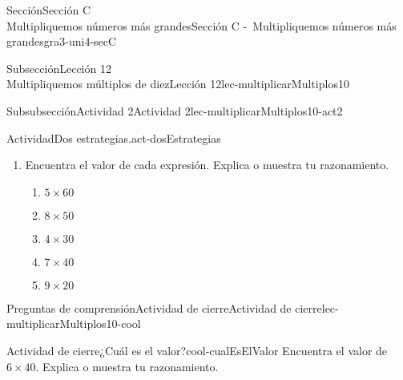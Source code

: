 \begin{sectionptx}{Sección}{{\Large Sección C\\}Multipliquemos números más grandes}{}{Sección C -~Multipliquemos números más grandes}{}{}{gra3-uni4-secC}
\begin{subsectionptx}{Subsección}{{\normalsize Lección 12\\[-0.05cm]}Multipliquemos múltiplos de diez}{}{Lección 12}{}{}{lec-multiplicarMultiplos10}
\begin{subsubsectionptx}{Subsubsección}{Actividad 2}{}{Actividad 2}{}{}{lec-multiplicarMultiplos10-act2}
\begin{activity}{Actividad}{Dos estrategias.}{act-dosEstrategias}
\begin{enumerate}
\begin{multicols}{2}
Dos estudiantes usaron bloques en base diez para encontrar el valor de \(8\times 30\).%
\begin{image}{0}{1}{0}{}%
\texttt{[image: external/svg-source/tikz-file-149356-scale13.pdf]}
\end{image}%
\end{multicols}
\begin{itemize}[label=\textbullet]
\item{}Jada contó: 30, 60, 90, 120, 150, 180, 210, 240 y dijo que la respuesta es 240.%
\item{}Kiran dijo que él sabía que \(8\times 3\) es 24, luego encontró \(24\times 10\) y obtuvo 240.%
\end{itemize}
¿En qué se parecen las estrategias de Jada y de Kiran? ¿En qué son diferentes?%
\item{}
\begin{multicols}{2}
Encuentra el valor de cada expresión. Explica o muestra tu razonamiento.%
%
\columnbreak
\begin{enumerate}
\item{}\(\displaystyle 5 \times 60\)%
\item{}\(\displaystyle 8 \times 50\)%
\item{}\(\displaystyle 4 \times 30\)%
\item{}\(\displaystyle 7 \times 40\)%
\item{}\(\displaystyle 9 \times 20\)%
\end{enumerate}
\end{multicols}
\end{enumerate}
\end{activity}%
\end{subsubsectionptx}
%
%
\typeout{************************************************}
\typeout{************************************************}
%
\begin{reading-questions-subsubsection}{Preguntas de comprensión}{Actividad de cierre}{}{Actividad de cierre}{}{}{lec-multiplicarMultiplos10-cool}
\begin{project}{Actividad de cierre}{¿Cuál es el valor?}{cool-cualEsElValor}%
Encuentra el valor de \(6\times 40\). Explica o muestra tu razonamiento.%
\end{project}%
\end{reading-questions-subsubsection}
\end{subsectionptx}
%

\end{sectionptx}
